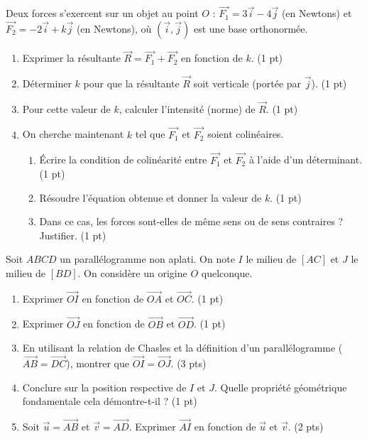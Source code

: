 \documentclass[11pt]{article}
\begin{document}
\begin{exercice}
Deux forces s'exercent sur un objet au point $O$ : $\vec{F_1}=3\vec{i}-4\vec{j}$ (en Newtons) et $\vec{F_2}=-2\vec{i}+k\vec{j}$ (en Newtons), où $(\vec{i}, \vec{j})$ est une base orthonormée.
\begin{enumerate}
    \item Exprimer la résultante $\vec{R}=\vec{F_1}+\vec{F_2}$ en fonction de $k$. \hfill (1 pt)
    \item Déterminer $k$ pour que la résultante $\vec{R}$ soit verticale (portée par $\vec{j}$). \hfill (1 pt)
    \item Pour cette valeur de $k$, calculer l'intensité (norme) de $\vec{R}$. \hfill (1 pt)
    \item On cherche maintenant $k$ tel que $\vec{F_1}$ et $\vec{F_2}$ soient colinéaires. \begin{enumerate}
        \item Écrire la condition de colinéarité entre $\vec{F_1}$ et $\vec{F_2}$ à l'aide d'un déterminant. \hfill (1 pt)
        \item Résoudre l'équation obtenue et donner la valeur de $k$. \hfill (1 pt)
        \item Dans ce cas, les forces sont-elles de même sens ou de sens contraires ? Justifier. \hfill (1 pt)
    \end{enumerate}
\end{enumerate}
\end{exercice}

\begin{exercice}
Soit $ABCD$ un parallélogramme non aplati. On note $I$ le milieu de $[AC]$ et $J$ le milieu de $[BD]$. On considère un origine $O$ quelconque.
\begin{enumerate}
    \item Exprimer $\overrightarrow{OI}$ en fonction de $\overrightarrow{OA}$ et $\overrightarrow{OC}$. \hfill (1 pt)
    \item Exprimer $\overrightarrow{OJ}$ en fonction de $\overrightarrow{OB}$ et $\overrightarrow{OD}$. \hfill (1 pt)
    \item En utilisant la relation de Chasles et la définition d'un parallélogramme ($\overrightarrow{AB}=\overrightarrow{DC}$), montrer que $\overrightarrow{OI}=\overrightarrow{OJ}$. \hfill (3 pts)
    \item Conclure sur la position respective de $I$ et $J$. Quelle propriété géométrique fondamentale cela démontre-t-il ? \hfill (1 pt)
    \item Soit $\vec{u}=\overrightarrow{AB}$ et $\vec{v}=\overrightarrow{AD}$. Exprimer $\overrightarrow{AI}$ en fonction de $\vec{u}$ et $\vec{v}$. \hfill (2 pts)
\end{enumerate}
\end{exercice}
\end{document}
